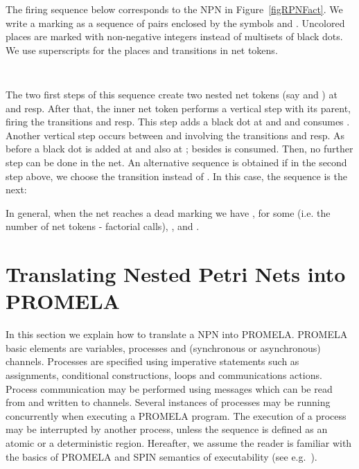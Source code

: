 \documentclass{llncs}
\begin{document}
\begin{example}
The firing sequence below corresponds to the NPN in Figure~\ref{figRPNFact}. We write a marking as a sequence of pairs  enclosed by the symbols  and . Uncolored places are marked with non-negative integers instead of multisets of black dots. We use superscripts for the places and transitions in net tokens.

\vspace{7pt}






\verb"           " 




\vspace{7pt}

The two first steps of this sequence create two nested net tokens (say  and ) at  and  resp. After that, the inner net token performs a vertical step with its parent, firing the transitions  and  resp. This step adds a black dot at  and  and consumes . Another vertical step occurs between  and  involving the transitions  and  resp. As before a black dot is added at  and also at ; besides  is consumed. Then, no further step can be done in the net. An alternative sequence is obtained if in the second step above, we choose the transition  instead of . In this case, the sequence is the next:

\vspace{7pt}





\vspace{7pt}

In general, when the net reaches a dead marking  we have ,  for some  (i.e.  the number of net tokens - factorial calls), ,  and  .
\end{example}




\section{Translating Nested Petri Nets into PROMELA}
\label{sec:rnpn2promela}

In this section we explain how to translate a NPN into PROMELA. PROMELA basic elements are variables, processes and  (synchronous or asynchronous) channels. Processes are specified using imperative statements such as assignments, conditional constructions, loops and communications actions. Process communication may be performed using messages which can be read from and written to channels. Several instances of processes may be running concurrently when executing a PROMELA program. The execution of a process may be interrupted by another process, unless the sequence is defined as an atomic or a deterministic region. Hereafter, we  assume the reader is familiar with the basics of PROMELA  and  SPIN  semantics of executability (see e.g.~\cite{spin}).
\end{document}

